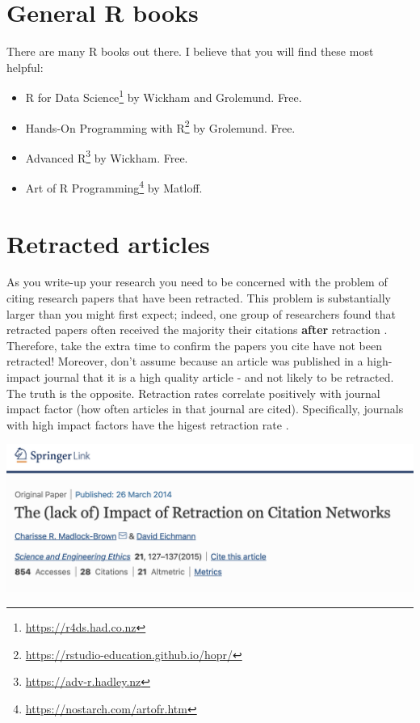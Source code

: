 \documentclass[
]{krantz}
\renewcommand{\href}[2]{#2\footnote{\url{#1}}}
\begin{document}
\hypertarget{general-r-books}{%
\section{General R books}\label{general-r-books}}

There are many R books out there. I believe that you will find these most helpful:

\begin{itemize}
\item
  \href{https://r4ds.had.co.nz}{R for Data Science} by Wickham and Grolemund. Free.
\item
  \href{https://rstudio-education.github.io/hopr/}{Hands-On Programming with R} by Grolemund. Free.
\item
  \href{https://adv-r.hadley.nz}{Advanced R} by Wickham. Free.
\item
  \href{https://nostarch.com/artofr.htm}{Art of R Programming} by Matloff.
\end{itemize}

\hypertarget{retracted-articles}{%
\section{Retracted articles}\label{retracted-articles}}

As you write-up your research you need to be concerned with the problem of citing research papers that have been retracted. This problem is substantially larger than you might first expect; indeed, one group of researchers found that retracted papers often received the majority their citations \textbf{after} retraction \citep{madlock2015lack}. Therefore, take the extra time to confirm the papers you cite have not been retracted! Moreover, don't assume because an article was published in a high-impact journal that it is a high quality article - and not likely to be retracted. The truth is the opposite. Retraction rates correlate positively with journal impact factor (how often articles in that journal are cited). Specifically, journals with high impact factors have the higest retraction rate \citep{fang2011retracted}.

\includegraphics[width=0.6\linewidth]{ch_tools/images/retract_impact}
\end{document}

